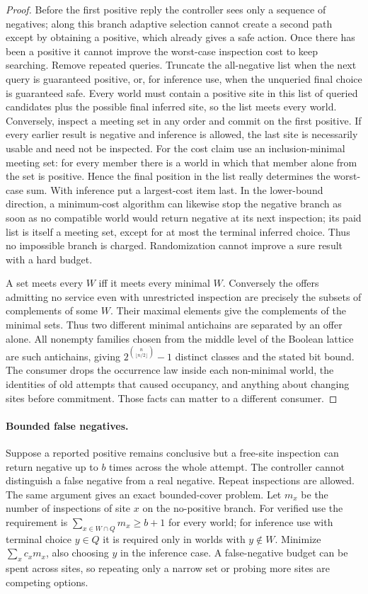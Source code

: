 \documentclass[11pt]{article}
\begin{document}
\begin{proof}
Before the first positive reply the controller sees only a sequence of negatives; along this branch adaptive selection cannot create a second path except by obtaining a positive, which already gives a safe action. Once there has been a positive it cannot improve the worst-case inspection cost to keep searching. Remove repeated queries. Truncate the all-negative list when the next query is guaranteed positive, or, for inference use, when the unqueried final choice is guaranteed safe. Every world must contain a positive site in this list of queried candidates plus the possible final inferred site, so the list meets every world. Conversely, inspect a meeting set in any order and commit on the first positive. If every earlier result is negative and inference is allowed, the last site is necessarily usable and need not be inspected. For the cost claim use an inclusion-minimal meeting set: for every member there is a world in which that member alone from the set is positive. Hence the final position in the list really determines the worst-case sum. With inference put a largest-cost item last. In the lower-bound direction, a minimum-cost algorithm can likewise stop the negative branch as soon as no compatible world would return negative at its next inspection; its paid list is itself a meeting set, except for at most the terminal inferred choice. Thus no impossible branch is charged. Randomization cannot improve a sure result with a hard budget.

A set meets every $W$ iff it meets every minimal $W$. Conversely the offers admitting no service even with unrestricted inspection are precisely the subsets of complements of some $W$. Their maximal elements give the complements of the minimal sets. Thus two different minimal antichains are separated by an offer alone. All nonempty families chosen from the middle level of the Boolean lattice are such antichains, giving $2^{\binom{n}{\lfloor n/2\rfloor}}-1$ distinct classes and the stated bit bound. The consumer drops the occurrence law inside each non-minimal world, the identities of old attempts that caused occupancy, and anything about changing sites before commitment. Those facts can matter to a different consumer.
\end{proof}

\paragraph{Bounded false negatives.}
Suppose a reported positive remains conclusive but a free-site inspection can return negative up to $b$ times across the whole attempt. The controller cannot distinguish a false negative from a real negative. Repeat inspections are allowed. The same argument gives an exact bounded-cover problem. Let $m_x$ be the number of inspections of site $x$ on the no-positive branch. For verified use the requirement is $\sum_{x\in W\cap Q}m_x\ge b+1$ for every world; for inference use with terminal choice $y\in Q$ it is required only in worlds with $y\notin W$. Minimize $\sum_x c_xm_x$, also choosing $y$ in the inference case. A false-negative budget can be spent across sites, so repeating only a narrow set or probing more sites are competing options.
\end{document}
